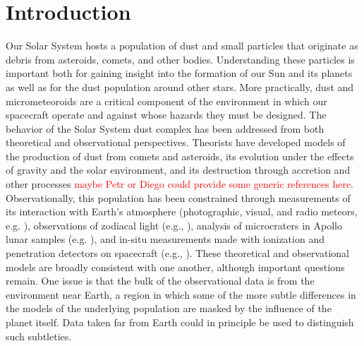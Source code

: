 \documentclass[twocolumn, trackchanges]{aastex61}
\newcommand{\red}[1]{\textcolor{red}{#1}}
\begin{document}
\section{Introduction} \label{sec:intro}
Our Solar System hosts a population of dust and small particles that originate as debris from asteroids, comets, and other bodies.  Understanding these particles is important both for gaining insight into the formation of our Sun and its planets as well as for the dust population around other stars. More practically, dust and micrometeoroids are a critical component of the environment in which our spacecraft operate and against whose hazards they must be designed.  The behavior of the Solar System dust complex has been addressed from both theoretical and observational perspectives. Theorists have developed models of the production of dust from comets and asteroids,  its evolution under the effects of gravity and the solar environment, and its destruction through accretion and other processes \red{maybe Petr or Diego could provide some generic references here}. Observationally, this population has been constrained through measurements of its interaction with Earth's atmosphere (photographic, visual, and radio meteors, e.g. \cite{Halliday1984, Hawkes2007, Trigo-Rodriguez2008}), observations of zodiacal light (e.g.,  \cite{Krick2012, Durmont1980}), analysis of microcraters in Apollo lunar samples (e.g.  \cite{Allison1982}), and in-situ measurements made with ionization and penetration detectors on spacecraft (e.g.,  \cite{Weiden1978, Zhang1995}).  These theoretical and observational models are broadly consistent with one another, although important questions remain. One issue is that the bulk of the observational data is from the environment near Earth, a region in which some of the more subtle differences in the models of the underlying population are masked by the influence of the planet itself. Data taken far from Earth could in principle be used to distinguish such subtleties.
\\
\end{document}
